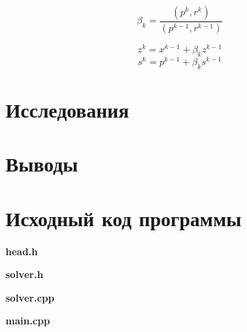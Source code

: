 \documentclass[12pt, a4paper]{article}
\newcommand{\myCodeInput}[3]{
{\bf #2}

}
\begin{document}
\[ \beta_k = \frac{( p^{k}, r^{k} )} {( p^{k-1}, r^{k-1} )} \]

\[ z^k = x^{k-1} + \beta_k z^{k-1} \]
\[ s^k = p^{k-1} + \beta_k s^{k-1} \]

\section{Исследования}


\section{Выводы}

\section{Исходный код программы}
\myCodeInput{c++}{head.h}{../head.h}
\myCodeInput{c++}{solver.h}{../solver.h}
\myCodeInput{c++}{solver.cpp}{../solver.cpp}
\myCodeInput{c++}{main.cpp}{../main.cpp}
\end{document}
